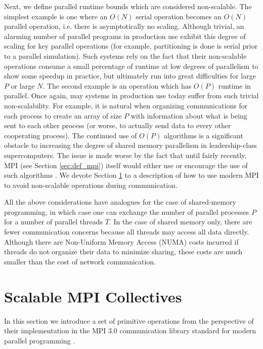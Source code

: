 Next, we define parallel runtime bounds which are considered non-scalable.
The simplest example is one where an $O(N)$ serial operation becomes
an $O(N)$ parallel operation, i.e. there is asymptotically no scaling.
Although trivial, an alarming number of parallel programs in production
use exhibit this degree of scaling for key parallel operations
(for example, partitioning is done is serial prior to a parallel simulation).
Such systems rely on the fact that their non-scalable operations
consume a small percentage of runtime at low degrees of parallelism
to show some speedup in practice, but ultimately run into great difficulties
for large $P$ or large $N$.
The second example is an operation which has $O(P)$ runtime in parallel.
Once again, may systems in production use today suffer from such
trivial non-scalability.
For example, it is natural when organizing communications for each process to create
an array of size $P$ with information about what is being sent to each
other process (or worse, to actually send data to every other cooperating process).
The continued use of $O(P)$ algorithms is a significant obstacle to
increasing the degree of shared memory parallelism in leadership-class supercomputers.
The issue is made worse by the fact that until fairly recently,
MPI (see Section \ref{sec:def_mpi}) itself would either use
or encourage the use of such algorithms \cite{balaji2009mpi}.
We devote Section \ref{sec:mpi3} to a description of how to use modern MPI
to avoid non-scalable operations during communication.

All the above considerations have analogues for the case of shared-memory programming,
in which case one can exchange the number of parallel processes $P$ for a number
of parallel threads $T$.
In the case of shared memory only, there are fewer communication concerns because
all threads may access all data directly.
Although there are Non-Uniform Memory Access (NUMA) costs incurred if threads do
not organize their data to minimize sharing, these costs are much smaller than
the cost of network communication.

\section{Scalable MPI Collectives}
\label{sec:mpi3}

In this section we introduce a set of primitive operations from the
perspective of their implementation in the MPI 3.0 communication library
standard for modern parallel programming \cite{gropp2014using}.

